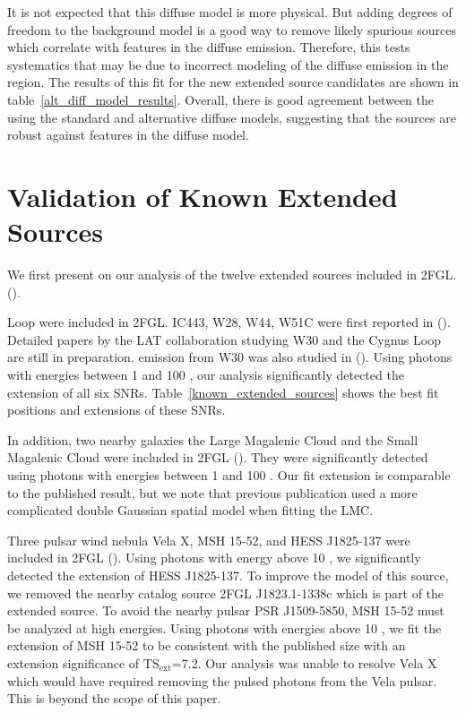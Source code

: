 \documentclass[12pt,preprint]{aastex}
\newcommand{\gev}{\text{GeV}\xspace}
\newcommand{\tsext}{{\ensuremath{\text{TS}_\text{ext}}}\xspace}
\newcommand{\ts}{\text{TS}\xspace}
\begin{document}
It is not expected that this diffuse model is more physical.
But adding degrees of freedom to the background model is a good
way to remove likely spurious sources which correlate with features in
the diffuse emission.  Therefore, this tests systematics that may
be due to incorrect modeling of the diffuse emission in the region.
The results of this fit for the new extended source candidates are shown
in table~\ref{alt_diff_model_results}. Overall, there is good agreement
between the \ts using the standard and alternative diffuse models, 
suggesting that the sources are robust against features in the
diffuse model.


\section{Validation of Known Extended Sources}
\label{validate_known}

We first present on our analysis of the twelve extended sources
included in 2FGL.
(\cite{second_cat}).

Loop were included in 2FGL.  IC443, W28, W44, W51C were first reported in
(\cite{ic443,w28,w44,w51c}).  Detailed papers by the LAT collaboration
studying W30 and the Cygnus Loop are still in preparation.  \gev emission
from W30 was also studied in (\cite{castro_and_slane_2010}).  Using photons
with energies between 1 \gev and 100 \gev, our analysis significantly
detected the extension
of all six SNRs. Table~\ref{known_extended_sources} shows the best fit
positions and extensions of these SNRs.


In addition, two nearby galaxies the Large Magalenic Cloud and the
Small Magalenic Cloud were included in 2FGL (\cite{lmc,smc}).  They were
significantly detected using photons with energies between 1 \gev and
100 \gev. Our fit extension is comparable to the published result,
but we note that previous publication used a more complicated double
Gaussian spatial model when fitting the LMC.

Three pulsar wind nebula Vela X, MSH 15-52, and HESS J1825-137 were
included in 2FGL (\cite{velax,msh1552,fermi_hess_j1825}).  Using photons
with energy above 10 \gev, we significantly detected the extension of
HESS J1825-137.  To improve the model of this source, we removed the
nearby catalog source 2FGL J1823.1-1338c which is part of the extended
source.  To avoid the nearby pulsar PSR J1509-5850, MSH 15-52 must be
analyzed at high energies.  Using photons with energies above 10 \gev,
we fit the extension of MSH 15-52 to be consistent with the published
size with an extension significance of \tsext=7.2.  Our analysis was
unable to resolve Vela X which would have required removing the pulsed
photons from the Vela pulsar. This is beyond the scope of this paper.
\end{document}
